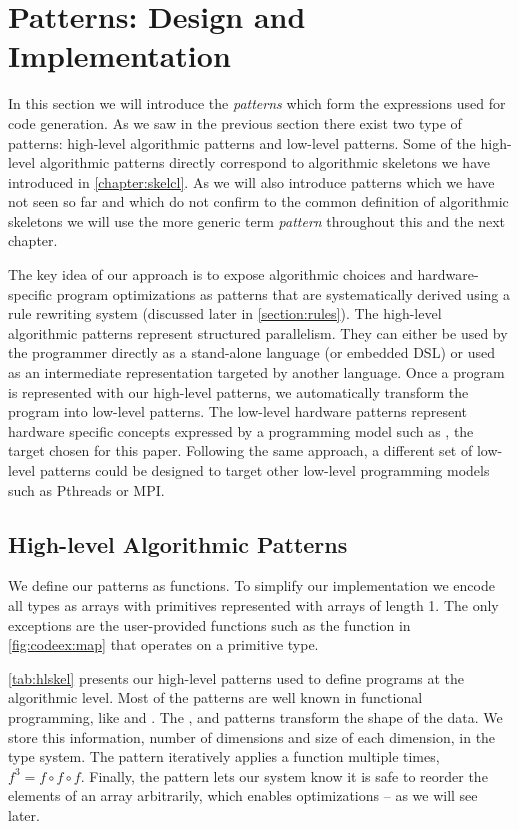 \section{Patterns: Design and Implementation}
\label{section:patterns}

In this section we will introduce the \emph{patterns} which form the expressions used for code generation.
As we saw in the previous section there exist two type of patterns: high-level algorithmic patterns and low-level \OpenCL patterns.
Some of the high-level algorithmic patterns directly correspond to algorithmic skeletons we have introduced in \autoref{chapter:skelcl}.
As we will also introduce patterns which we have not seen so far and which do not confirm to the common definition of algorithmic skeletons we will use the more generic term \emph{pattern} throughout this and the next chapter.

The key idea of our approach is to expose algorithmic choices and hardware-specific program optimizations as patterns that are systematically derived using a rule rewriting system (discussed later in \autoref{section:rules}).
The high-level algorithmic patterns represent structured parallelism.
They can either be used by the programmer directly as a stand-alone language (or embedded DSL) or used as an intermediate representation targeted by another language.
Once a program is represented with our high-level patterns, we automatically transform the program into low-level patterns.
The low-level hardware patterns represent hardware specific concepts expressed by a programming model such as \OpenCL, the target chosen for this paper.
Following the same approach, a different set of low-level patterns could be designed to target other low-level programming models such as Pthreads or MPI.


\subsection{High-level Algorithmic Patterns}

We define our patterns as functions.
To simplify our implementation we encode all types as arrays with primitives represented with arrays of length 1.
The only exceptions are the user-provided functions such as the  function in \autoref{fig:codeex:map} that operates on a primitive type.

\autoref{tab:hlskel} presents our high-level patterns used to define programs at the algorithmic level.
Most of the patterns are well known in functional programming, like  and .
The ,  and  patterns transform the shape of the data.
We store this information, \ie number of dimensions and size of each dimension, in the type system.
The  pattern iteratively applies a function multiple times, \eg $f^3 = f \circ f \circ f$. %
Finally, the  pattern lets our system know it is safe to
reorder the elements of an array arbitrarily, which enables optimizations -- as we will see later.


